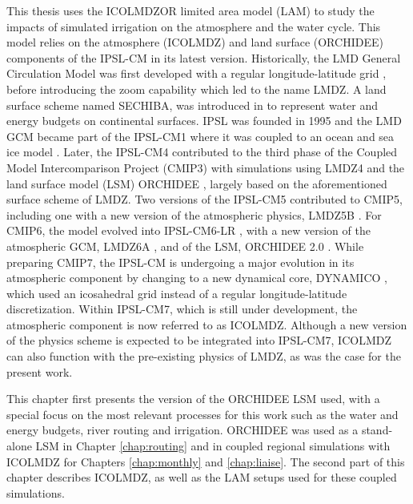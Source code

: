 This thesis uses the ICOLMDZOR limited area model (LAM) to study the impacts of simulated irrigation on the atmosphere and the water cycle. This model relies on the atmosphere (ICOLMDZ) and land surface (ORCHIDEE) components of the IPSL-CM in its latest version. 
Historically, the LMD General Circulation Model was first developed with a regular longitude-latitude grid \citep{sadourny_laval_1984}, before introducing the zoom capability \citep{li_ensemble_1999} which led to the name LMDZ. 
A land surface scheme named SECHIBA, was introduced in \citet{ducoudre_sechiba_1993} to represent water and energy budgets on continental surfaces. 
IPSL was founded in 1995 and the LMD GCM became part of the IPSL-CM1 where it was coupled to an ocean and sea ice model \citep{braconnot_adjustment_1997}.
Later, the IPSL-CM4 contributed to the third phase of the Coupled Model Intercomparison Project (CMIP3) with simulations using LMDZ4 \citep{hourdin_lmdz4_2006} and the land surface model (LSM) ORCHIDEE \citep{krinner_dynamic_2005}, largely based on the aforementioned surface scheme of LMDZ.
Two versions of the IPSL-CM5 contributed to CMIP5, including one with a new version of the atmospheric physics, LMDZ5B \citep{hourdin_lmdz5b_2013}.
For CMIP6, the model evolved into IPSL-CM6-LR \citep{boucher_presentation_2020}, with a new version of the atmospheric GCM, LMDZ6A \citep{hourdin_lmdz6a_2020}, and of the LSM, ORCHIDEE 2.0 \citep{cheruy_improved_2020}. 
While preparing CMIP7, the IPSL-CM is undergoing a major evolution in its atmospheric component by changing to a new dynamical core, DYNAMICO \citep{dubos_dynamico-10_2015}, which used an icosahedral grid instead of a regular longitude-latitude discretization. Within IPSL-CM7, which is still under development, the atmospheric component is now referred to as ICOLMDZ. Although a new version of the physics scheme is expected to be integrated into IPSL-CM7, ICOLMDZ can also function with the pre-existing physics of LMDZ, as was the case for the present work.

This chapter first presents the version of the ORCHIDEE LSM used, with a special focus on the most relevant processes for this work such as the water and energy budgets, river routing and irrigation. ORCHIDEE was used as a stand-alone LSM in Chapter \ref{chap:routing} and in coupled regional simulations with ICOLMDZ for Chapters \ref{chap:monthly} and \ref{chap:liaise}. The second part of this chapter describes ICOLMDZ, as well as the LAM setups used for these coupled simulations.

